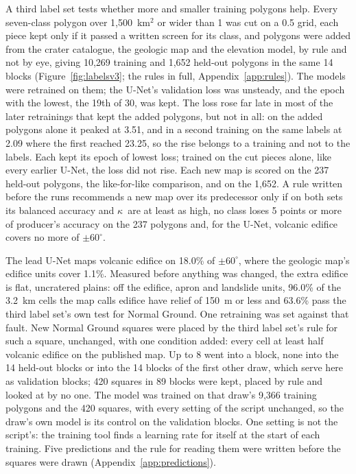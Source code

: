 \documentclass[twocolumn]{aastex701}
\newcommand{\pmsixty}{$\pm60^{\circ}$}
\newcommand{\kap}{$\kappa$}
\begin{document}
A third label set tests whether more and smaller training polygons help. Every seven-class polygon over
1,500~km$^2$ or wider than 1\textdegree{} was cut on a 0.5\textdegree{} grid, each piece kept only if it passed a
written screen for its class, and polygons were added from the crater catalogue, the geologic map and the elevation
model, by rule and not by eye, giving 10,269 training and 1,652 held-out polygons in the same 14 blocks
(Figure~\ref{fig:labelsv3}; the rules in full, Appendix~\ref{app:rules}). The models
were retrained on them; the U-Net's validation loss was unsteady, and the epoch with the lowest, the 19th of 30, was kept.
The loss rose far late in most of the later retrainings that kept the added polygons, but not in all: on the added
polygons alone it peaked at 3.51, and in a second training on the same labels at 2.09 where the first reached 23.25,
so the rise belongs to a training and not to the labels. Each kept its epoch of lowest loss; trained on the cut pieces
alone, like every earlier U-Net, the loss did not rise. %
Each new map is scored on the 237 held-out polygons, the like-for-like comparison, and on the 1,652. A rule written
before the runs recommends a new map over its predecessor only if on both sets its balanced accuracy and \kap\ are at
least as high, no class loses 5 points or more of producer's accuracy on the 237 polygons and, for the U-Net, volcanic
edifice covers no more of \pmsixty. %


The lead U-Net maps volcanic edifice on 18.0\% of \pmsixty, where the geologic map's edifice units cover 1.1\%. Measured
before anything was changed, the extra edifice is flat, uncratered plains: off the edifice, apron and landslide units,
96.0\% of the 3.2~km cells the map calls edifice have relief of 150~m or less and 63.6\% pass the third label set's own
test for Normal Ground. One retraining was set against that fault. New Normal Ground squares were placed by the third
label set's rule for such a square, unchanged, with one condition added: every cell at least half volcanic edifice on
the published map. Up to 8 went into a block, none into the 14 held-out blocks or into the 14 blocks of the first
other draw, which serve here as validation blocks; 420 squares in 89 blocks were kept, placed by rule and looked at by
no one. The model was trained on that draw's 9,366 training polygons and the 420 squares, with every setting of the
script unchanged, so the draw's own model is its control on the validation blocks. One setting is not the script's:
the training tool finds a learning rate for itself at the start of each training. Five predictions and the rule for
reading them were written before the squares were drawn (Appendix~\ref{app:predictions}). %
\end{document}
